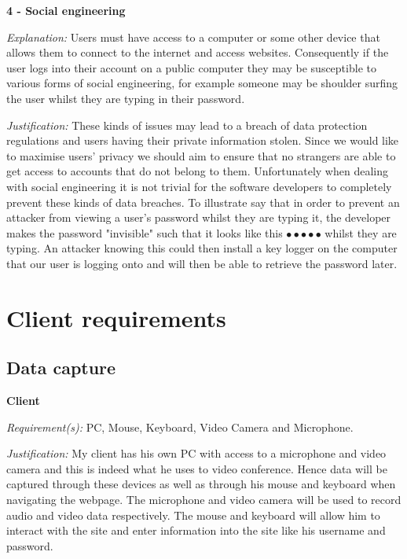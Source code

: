 \textsf{\bfseries 4 - Social engineering} \\ \vspace{0.1cm}

\textit{Explanation:}
Users must have access to a computer or some other device that
allows them to connect to the internet and access websites.
Consequently if the user logs into their account on a public
computer they may be susceptible to various forms of social
engineering, for example someone may be shoulder surfing the
user whilst they are typing in their password. \vspace{0.1cm}

\textit{Justification:}
These kinds of issues may lead to a breach of data protection
regulations and users having their private information stolen.
Since we would like to maximise users' privacy we should aim
to ensure that no strangers are able to get access to accounts
that do not belong to them. Unfortunately when dealing with
social engineering it is not trivial for the software
developers to completely prevent these kinds of data breaches.
To illustrate say that in order to prevent an attacker from
viewing a user's password whilst they are typing it, the
developer makes the password "invisible" such that it looks
like this  $\bullet \bullet \bullet \bullet \bullet$ whilst
they are typing. An attacker knowing this could then install
a key logger on the computer that our user is logging onto and
will then be able to retrieve the password later.

\section{Client requirements}

\subsection{Data capture}

\textsf{\bfseries Client} \\ \vspace{0.1cm}

\textit{Requirement(s):} PC, Mouse, Keyboard, Video Camera and Microphone.
\\ \vspace{0.1cm}

\textit{Justification:}
My client has his own PC with access to a microphone
and video camera and this is indeed what he uses to
video conference. Hence data will be captured
through these devices as well as through his mouse
and keyboard when navigating the webpage. The microphone
and video camera will be used to record audio and video
data respectively. The mouse and keyboard will allow
him to interact with the site and enter information
into the site like his username and password.
\\ \vspace{0.2cm}

